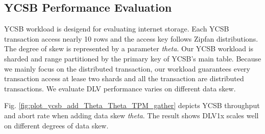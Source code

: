 \documentclass[conference]{IEEEtran}
\begin{document}
\subsection{YCSB Performance Evaluation}

YCSB\cite{YCSB:conf/cloud/CooperSTRS10} workload is desigend for evaluating internet storage.
Each YCSB transaction access nearly 10 rows and the access key follows Zipfan distributions.
The degree of skew is represented by a parameter \emph{theta}.
Our YCSB workload is sharded and range partitioned by the primary key of YCSB's main table.
Because we mainly focus on the distributed transaction, our workload guarantees every transaction access at lease two shards and all the transaction are distributed transactions.
We evaluate DLV performance varies on different data skew.


Fig.    \ref{fig:plot_ycsb_add_Theta_Theta_TPM_gather} depicts YCSB throughput and abort rate when adding data skew \emph{theta}.
The result shows DLV1x scales well on different degrees of data skew.
\end{document}
